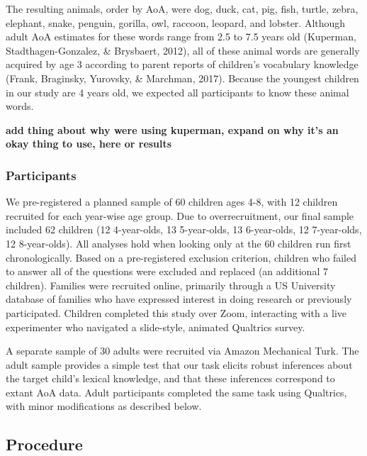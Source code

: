 \documentclass[10pt, letterpaper]{article}
\begin{document}
The resulting animals, order by AoA, were dog, duck, cat, pig, fish,
turtle, zebra, elephant, snake, penguin, gorilla, owl, raccoon, leopard,
and lobster. Although adult AoA estimates for these words range from 2.5
to 7.5 years old (Kuperman, Stadthagen-Gonzalez, \& Brysbaert, 2012),
all of these animal words are generally acquired by age 3 according to
parent reports of children's vocabulary knowledge (Frank, Braginsky,
Yurovsky, \& Marchman, 2017). Because the youngest children in our study
are 4 years old, we expected all participants to know these animal
words.

\textbf{add thing about why were using kuperman, expand on why it's an
okay thing to use, here or results}

\hypertarget{participants}{%
\subsubsection{Participants}\label{participants}}

We pre-registered a planned sample of 60 children ages 4-8, with 12
children recruited for each year-wise age group. Due to overrecruitment,
our final sample included 62 children (12 4-year-olds, 13 5-year-olds,
13 6-year-olds, 12 7-year-olds, 12 8-year-olds). All analyses hold when
looking only at the 60 children run first chronologically. Based on a
pre-registered exclusion criterion, children who failed to answer all of
the questions were excluded and replaced (an additional 7 children).
Families were recruited online, primarily through a US University
database of families who have expressed interest in doing research or
previously participated. Children completed this study over Zoom,
interacting with a live experimenter who navigated a slide-style,
animated Qualtrics survey.

A separate sample of 30 adults were recruited via Amazon Mechanical
Turk. The adult sample provides a simple test that our task elicits
robust inferences about the target child's lexical knowledge, and that
these inferences correspond to extant AoA data. Adult participants
completed the same task using Qualtrics, with minor modifications as
described below.

\hypertarget{procedure}{%
\subsection{Procedure}\label{procedure}}
\end{document}
